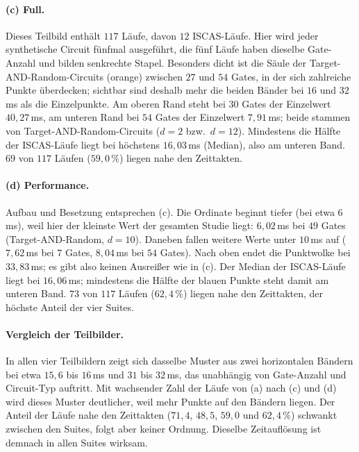 \documentclass[a4paper,12pt]{article}
\theoremstyle{definition}
\begin{document}
\paragraph{(c) Full.} Dieses Teilbild enthält $117$ Läufe, davon $12$ ISCAS-Läufe. Hier wird jeder synthetische Circuit fünfmal ausgeführt, die fünf Läufe haben dieselbe Gate-Anzahl und bilden senkrechte Stapel. Besonders dicht ist die Säule der Target-AND-Random-Circuits (orange) zwischen $27$ und $54$ Gates, in der sich zahlreiche Punkte überdecken; sichtbar sind deshalb mehr die beiden Bänder bei $16$ und $32$\,ms als die Einzelpunkte. Am oberen Rand steht bei $30$ Gates der Einzelwert $40{,}27$\,ms, am unteren Rand bei $54$ Gates der Einzelwert $7{,}91$\,ms; beide stammen von Target-AND-Random-Circuits ($d = 2$ bzw.\ $d = 12$). Mindestens die Hälfte der ISCAS-Läufe liegt bei höchstens $16{,}03$\,ms (Median), also am unteren Band. $69$ von $117$ Läufen ($59{,}0\,\%$) liegen nahe den Zeittakten.

\paragraph{(d) Performance.} Aufbau und Besetzung entsprechen (c). Die Ordinate beginnt tiefer (bei etwa $6$\,ms), weil hier der kleinste Wert der gesamten Studie liegt: $6{,}02$\,ms bei $49$ Gates (Target-AND-Random, $d = 10$). Daneben fallen weitere Werte unter $10$\,ms auf ($7{,}62$\,ms bei $7$ Gates, $8{,}04$\,ms bei $54$ Gates). Nach oben endet die Punktwolke bei $33{,}83$\,ms; es gibt also keinen Ausreißer wie in (c). Der Median der ISCAS-Läufe liegt bei $16{,}06$\,ms; mindestens die Hälfte der blauen Punkte steht damit am unteren Band. $73$ von $117$ Läufen ($62{,}4\,\%$) liegen nahe den Zeittakten, der höchste Anteil der vier Suites.

\paragraph{Vergleich der Teilbilder.} In allen vier Teilbildern zeigt sich dasselbe Muster aus zwei horizontalen Bändern bei etwa $15{,}6$ bis $16$\,ms und $31$ bis $32$\,ms, das unabhängig von Gate-Anzahl und Circuit-Typ auftritt. Mit wachsender Zahl der Läufe von (a) nach (c) und (d) wird dieses Muster deutlicher, weil mehr Punkte auf den Bändern liegen. Der Anteil der Läufe nahe den Zeittakten ($71{,}4$, $48{,}5$, $59{,}0$ und $62{,}4\,\%$) schwankt zwischen den Suites, folgt aber keiner Ordnung. Dieselbe Zeitauflösung ist demnach in allen Suites wirksam.
\end{document}
